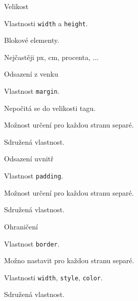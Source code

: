 \documentclass[aspectratio=1610]{beamer}
\begin{document}
\begin{frame}{Velikost}
    \begin{cardTiny}
        \begin{flushleft}
            Vlastnosti \texttt{width} a \texttt{height}.

            \vspace{2ex}

            Blokové elementy. 

            Nejčastěji px, cm, procenta, ...
        \end{flushleft}
    \end{cardTiny}
\end{frame}

\begin{frame}{Odsazení z venku}
    \begin{cardTiny}
        \begin{flushleft}
            Vlastnost \texttt{margin}.

            \vspace{2ex}

            Nepočitá se do velikosti tagu.

            Možnost určení pro každou stranu separé.

            Sdružená vlastnost.
        \end{flushleft}
    \end{cardTiny}
\end{frame}

\begin{frame}{Odsazení uvnitř}
    \begin{cardTiny}
        \begin{flushleft}
            Vlastnost \texttt{padding}.

            \vspace{2ex}

            Možnost určení pro každou stranu separé.

            Sdružená vlastnost.
        \end{flushleft}
    \end{cardTiny}
\end{frame}

\begin{frame}{Ohraničení}
    \begin{cardTiny}
        \begin{flushleft}
            Vlastnost \texttt{border}.

            \vspace{2ex}

            Možno nastavit pro každou stranu separé.

            Vlastnosti \texttt{width}, \texttt{style}, \texttt{color}.

            Sdružená vlastnost.
        \end{flushleft}
    \end{cardTiny}
\end{frame}
\end{document}
